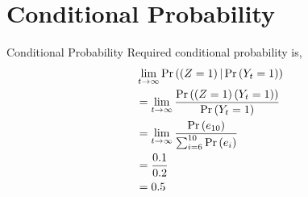 \documentclass{beamer}
\begin{document}
\section{Conditional Probability}
\begin{frame}{Conditional Probability}
    Required conditional probability is,
    \begin{align}
       &\lim_{t \to \infty} \Pr\left(\left(Z=1\right) | \Pr\left(Y_t=1\right)\right) \\
       &= \lim_{t \to \infty} \frac{\Pr\left(\left(Z=1\right)\left(Y_t=1\right)\right)}{\Pr\left(Y_t=1\right)} \\
       &= \lim_{t \to \infty} \frac{ \Pr\left(e_{10}\right) }  { \sum_{i=6}^{10}\Pr\left(e_i\right) } \\
       &= \frac{0.1}{0.2} \\
       &= 0.5
    \end{align}
\end{frame}
\end{document}
